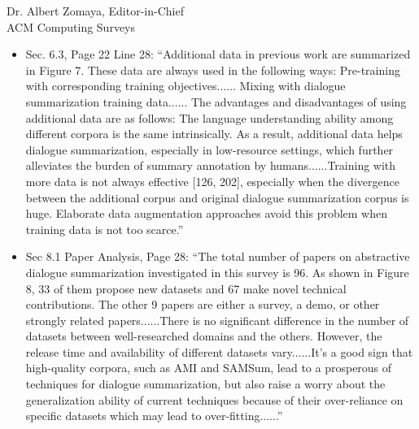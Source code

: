 \documentclass[11pt]{letter} %
\begin{document}
\begin{letter}{
Dr. Albert Zomaya, Editor-in-Chief  \\
ACM Computing Surveys}
\begin{enumerate}
\begin{itemize}
			\item Sec. 6.3, Page 22 Line 28: ``Additional data in previous work are summarized in Figure 7. These data are always used in the following ways: Pre-training with corresponding training objectives...... Mixing with dialogue summarization training data...... The advantages and disadvantages of using additional data are as follows: The language understanding ability among different corpora is the same intrinsically. As a result, additional data helps dialogue summarization, especially in low-resource settings, which further alleviates the burden of summary annotation by humans......Training with more data is not always effective [126, 202], especially when the divergence between the additional corpus and original dialogue summarization corpus is huge. Elaborate data augmentation approaches avoid this problem when training data is not too scarce.''
			\item Sec 8.1 Paper Analysis, Page 28: ``The total number of papers on abstractive dialogue summarization investigated in this survey is 96. As shown in Figure 8, 33 of them propose new datasets and 67 make novel technical contributions. The other 9 papers are either a survey, a demo, or other strongly related papers......There is no significant difference in the number of datasets between well-researched domains and the others. However, the release time and availability of different datasets vary......It’s a good sign that high-quality corpora, such as AMI and SAMSum, lead to a prosperous of techniques for dialogue summarization, but also raise a worry about the generalization ability of current techniques because of their over-reliance on specific datasets which may lead to over-fitting......''

\end{itemize}
\end{enumerate}
\end{letter}
\end{document}
